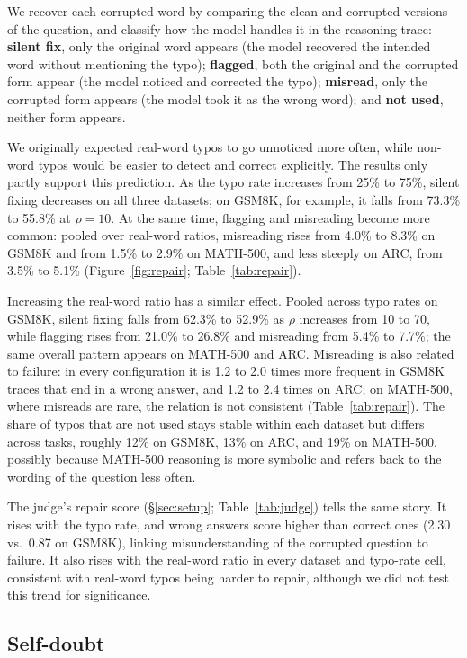 \documentclass[11pt]{article}
\begin{document}
We recover each corrupted word by comparing the clean and corrupted versions of
the question, and classify how the model handles it in the reasoning trace:
\textbf{silent fix}, only the original word appears (the model recovered the
intended word without mentioning the typo); \textbf{flagged}, both the original
and the corrupted form appear (the model noticed and corrected the typo);
\textbf{misread}, only the corrupted form appears (the model took it as the
wrong word); and \textbf{not used}, neither form appears.

We originally expected real-word typos to go unnoticed more often, while
non-word typos would be easier to detect and correct explicitly. The results
only partly support this prediction. As the typo rate increases from 25\% to
75\%, silent fixing decreases on all three datasets; on GSM8K, for example, it
falls from 73.3\% to 55.8\% at $\rho{=}10$. At the same time, flagging and
misreading become more common: pooled over real-word ratios, misreading rises
from 4.0\% to 8.3\% on GSM8K and from 1.5\% to 2.9\% on MATH-500, and less
steeply on ARC, from 3.5\% to 5.1\% (Figure~\ref{fig:repair};
Table~\ref{tab:repair}).

Increasing the real-word ratio has a similar effect. Pooled across typo rates on
GSM8K, silent fixing falls from 62.3\% to 52.9\% as $\rho$ increases from 10 to
70, while flagging rises from 21.0\% to 26.8\% and misreading from 5.4\% to
7.7\%; the same overall pattern appears on MATH-500 and ARC. Misreading is also
related to failure: in every configuration it is 1.2 to 2.0 times more frequent
in GSM8K traces that end in a wrong answer, and 1.2 to 2.4 times on ARC; on
MATH-500, where misreads are rare, the relation is not consistent
(Table~\ref{tab:repair}). The share of typos that are not used stays stable
within each dataset but differs across tasks, roughly 12\% on GSM8K, 13\% on
ARC, and 19\% on MATH-500, possibly because MATH-500 reasoning is more symbolic
and refers back to the wording of the question less often.

The judge's repair score (\S\ref{sec:setup}; Table~\ref{tab:judge}) tells the
same story. It rises with the typo rate, and wrong answers score higher than
correct ones (2.30 vs.\ 0.87 on GSM8K), linking misunderstanding of the
corrupted question to failure. It also rises with the real-word ratio in every
dataset and typo-rate cell, consistent with real-word typos being harder to
repair, although we did not test this trend for significance.

\subsection{Self-doubt}
\label{sec:doubt}
\end{document}
